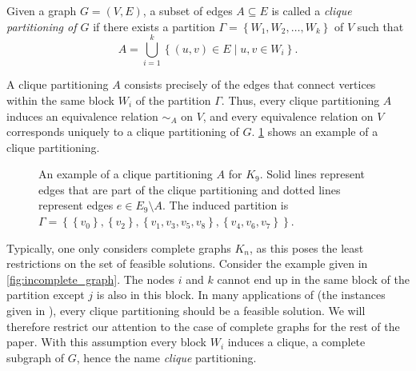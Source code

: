 \begin{definition}[\CP]\label{def:cp}
	Given a graph $G=(V,E)$, a subset of edges $A \subseteq E$ is called a \textit{clique partitioning of $G$} if there exists a partition $\Gamma = \left\{ W_1, W_2, \ldots, W_k \right\}$ of $V$ such that
	\[
		A = \bigcup_{i=1}^k \left\{ (u,v) \in E \mid u,v \in W_i \right\}.
	\]
\end{definition}
\begin{note}
A clique partitioning $A$ consists precisely of the edges that connect vertices within the same block $W_i$ of the partition $\Gamma$.
Thus, every clique partitioning $A$ induces an equivalence relation $\sim_A$ on $V$, and every equivalence relation on $V$ corresponds uniquely to a clique partitioning of $G$.
\cref{fig:example_clique_partitioning} shows an example of a clique partitioning.
\end{note}

\begin{figure}[H]
	\centering
	\caption[Example clique partitioning]{An example of a clique partitioning $A$ for $K_{9}$. 
		Solid lines represent edges that are part of the clique partitioning and dotted lines represent edges $e \in E_{9} \setminus A$.
	The induced partition is $\Gamma = \left\{ \left\{ v_{0} \right\}, \left\{ v_{2} \right\}, \left\{ v_{1}, v_{3}, v_{5}, v_{8} \right\}, \left\{ v_{4}, v_{6}, v_{7} \right\} \right\}$.}
	\label{fig:example_clique_partitioning}
\end{figure}

Typically, one only considers complete graphs $K_n$, as this poses the least restrictions on the set of feasible solutions.
Consider \eg the example given in \cref{fig:incomplete_graph}.
The nodes $i$ and $k$ cannot end up in the same block of the partition except $j$ is also in this block.
In many applications of \CP (\eg the instances given in \cite{grotschelCuttingPlaneAlgorithm1989}), every clique partitioning should be a feasible solution.
We will therefore restrict our attention to the case of complete graphs for the rest of the paper.
With this assumption every block $W_i$ induces a clique, \ie a complete subgraph of $G$, hence the name \textit{clique} partitioning.

